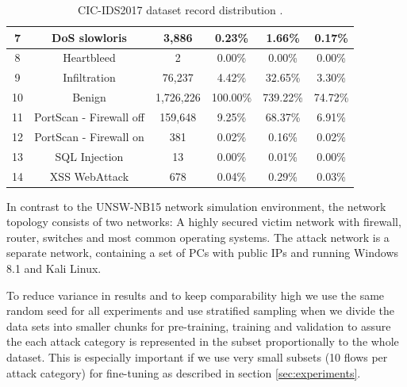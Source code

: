 \begin{table}[H]
\begin{tabular}{cccccc}
		7  & DoS slowloris           & 3,886        & 0.23\%                 & 1.66\%                          & 0.17\%                    \\ \midrule
		8  & Heartbleed              & 2           & 0.00\%                 & 0.00\%                          & 0.00\%                    \\ \midrule
		9  & Infiltration            & 76,237       & 4.42\%                 & 32.65\%                         & 3.30\%                    \\ \midrule
		10 & Benign                  & 1,726,226     & 100.00\%               & 739.22\%                        & 74.72\%                   \\ \midrule
		11 & PortScan - Firewall off & 159,648      & 9.25\%                 & 68.37\%                         & 6.91\%                    \\ \midrule
		12 & PortScan - Firewall on  & 381         & 0.02\%                 & 0.16\%                          & 0.02\%                    \\ \midrule
		13 & SQL Injection           & 13          & 0.00\%                 & 0.01\%                          & 0.00\%                    \\ \midrule
		14 & XSS WebAttack           & 678         & 0.04\%                 & 0.29\%                          & 0.03\%                   
	\end{tabular}
	\caption{CIC-IDS2017 dataset record distribution \cite{cic_ids_2017_analysis}.}
	\label{table:methodology:datasets:cic_ids_2017_categories}
\end{table}

In contrast to the UNSW-NB15 network simulation environment, the network topology consists of two networks: A highly secured victim network with firewall, router, switches and most common operating systems. The attack network is a separate network, containing a set of PCs with public IPs and running Windows 8.1 and Kali Linux.

To reduce variance in results and to keep comparability high we use the same random seed for all experiments and use stratified sampling when we divide the data sets into smaller chunks for pre-training, training and validation to assure the each attack category is represented in the subset proportionally to the whole dataset. This is especially important if we use very small subsets (10 flows per attack category) for fine-tuning as described in section \ref{sec:experiments}. 

